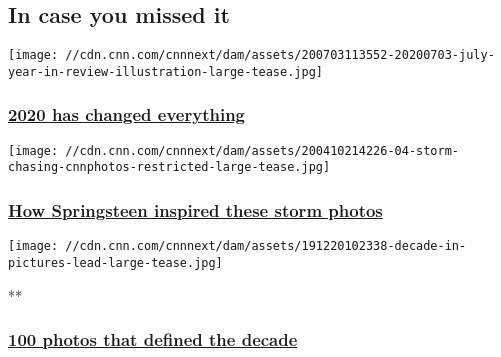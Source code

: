 \hypertarget{in-case-you-missed-it-}{%
\subsection{In case you missed it~}\label{in-case-you-missed-it-}}

\href{https://www.cnn.com/interactive/2020/07/world/2020-year-in-review-july/}{}

\texttt{[image: //cdn.cnn.com/cnnnext/dam/assets/200703113552-20200703-july-year-in-review-illustration-large-tease.jpg]}

\hypertarget{2020-has-changed-everything}{%
\subsubsection{\texorpdfstring{\href{https://www.cnn.com/interactive/2020/07/world/2020-year-in-review-july/}{2020
has changed
everything}}{2020 has changed everything}}\label{2020-has-changed-everything}}

\href{https://www.cnn.com/interactive/2020/04/weather/storm-chasing-eric-meola-cnnphotos/index.html}{}

\texttt{[image: //cdn.cnn.com/cnnnext/dam/assets/200410214226-04-storm-chasing-cnnphotos-restricted-large-tease.jpg]}

\hypertarget{how-springsteen-inspired-these-storm-photos}{%
\subsubsection{\texorpdfstring{\href{https://www.cnn.com/interactive/2020/04/weather/storm-chasing-eric-meola-cnnphotos/index.html}{How
Springsteen inspired these storm
photos}}{How Springsteen inspired these storm photos}}\label{how-springsteen-inspired-these-storm-photos}}

\href{/2019/12/20/world/gallery/decade-in-pictures/index.html}{}

\texttt{[image: //cdn.cnn.com/cnnnext/dam/assets/191220102338-decade-in-pictures-lead-large-tease.jpg]}

**

\hypertarget{100-photos-that-defined-the-decade}{%
\subsubsection{\texorpdfstring{\href{/2019/12/20/world/gallery/decade-in-pictures/index.html}{100
photos that defined the
decade}}{100 photos that defined the decade}}\label{100-photos-that-defined-the-decade}}

